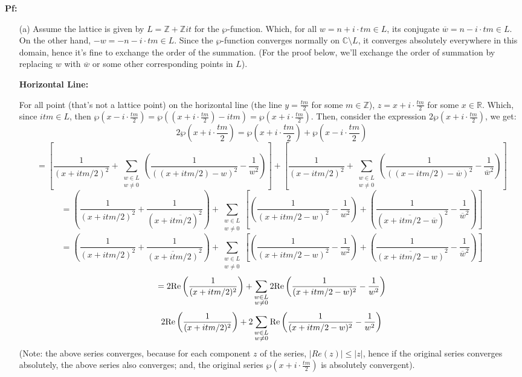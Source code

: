 \documentclass{article}
\begin{document}
\textbf{Pf:}
\begin{itemize}
    \item[(a)] Assume the lattice is given by $L=\mathbb{Z}+\mathbb{Z}it$ for the $\wp$-function. Which, for all $w=n+i\cdot tm\in L$, its conjugate $\overline{w}=n-i\cdot tm\in L$. On the other hand, $-w = -n-i\cdot tm\in L$. Since the $\wp$-function converges normally on $\mathbb{C}\setminus L$, it converges absolutely everywhere in this domain, hence it's fine to exchange the order of the summation. (For the proof below, we'll exchange the order of summation by replacing $w$ with $\overline{w}$ or some other corresponding points in $L$).
    
    \textbf{Horizontal Line:}
    
    For all point (that's not a lattice point) on the horizontal line (the line $y=\frac{tm}{2}$ for some $m\in\mathbb{Z}$), $z=x+i\cdot\frac{tm}{2}$ for some $x\in\mathbb{R}$. 
    Which, since $itm\in L$, then $\wp(x-i\cdot\frac{tm}{2})=\wp((x+i\cdot\frac{tm}{2})-itm) = \wp(x+i\cdot\frac{tm}{2})$. Then, consider the expression $2\wp(x+i\cdot\frac{tm}{2})$, we get:
    $$2\wp\left(x+i\cdot\frac{tm}{2}\right) = \wp\left(x+i\cdot\frac{tm}{2}\right)+\wp\left(x-i\cdot\frac{tm}{2}\right)$$
    $$=\left[\frac{1}{(x+itm/2)^2}+\sum_{\substack{w\in L\\w\neq 0}}\left(\frac{1}{((x+itm/2)-w)^2}-\frac{1}{w^2}\right)\right]+\left[\frac{1}{(x-itm/2)^2}+\sum_{\substack{w\in L\\w\neq 0}}\left(\frac{1}{((x-itm/2)-\overline{w})^2}-\frac{1}{\overline{w}^2}\right)\right]$$
    $$=\left(\frac{1}{(x+itm/2)^2}+\frac{1}{(x+\overline{itm/2})^2}\right)+\sum_{\substack{w\in L\\w\neq 0}}\left[\left(\frac{1}{(x+itm/2-w)^2}-\frac{1}{w^2}\right)+\left(\frac{1}{(x+\overline{itm/2}-\overline{w})^2}-\frac{1}{\overline{w}^2}\right)\right]$$
    $$=\left(\frac{1}{(x+itm/2)^2}+\frac{1}{\overline{(x+itm/2)}^2}\right)+\sum_{\substack{w\in L\\w\neq 0}}\left[\left(\frac{1}{(x+itm/2-w)^2}-\frac{1}{w^2}\right)+\left(\frac{1}{\overline{(x+itm/2-w)}^2}-\frac{1}{\overline{w}^2}\right)\right]$$
    $$= 2\textmd{Re}\left(\frac{1}{(x+itm/2)^2}\right)+\sum_{\substack{w\in L\\w\neq 0}}2\textmd{Re}\left(\frac{1}{(x+itm/2-w)^2}-\frac{1}{w^2}\right)$$
    $$2\textmd{Re}\left(\frac{1}{(x+itm/2)^2}\right)+2\sum_{\substack{w\in L\\w\neq 0}}\textmd{Re}\left(\frac{1}{(x+itm/2-w)^2}-\frac{1}{w^2}\right)$$
    (Note: the above series  converges, because for each component $z$ of the series, $|Re(z)|\leq |z|$, hence if the original series converges absolutely, the above series also converges; and, the original series $\wp(x+i\cdot\frac{tm}{2})$ is absolutely convergent).
    

\end{itemize}
\end{document}
